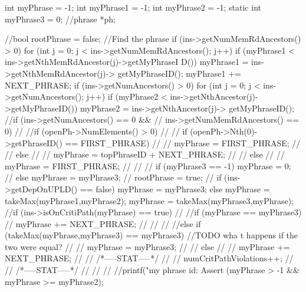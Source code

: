 \begin{DoxyCode}
                                            {
        int myPhrase  = -1;
        int myPhrase1 = -1;
        int myPhrase2 = -1;
        static int myPhrase3 = 0;
        //phrase *ph;

        //bool rootPhrase = false;
        //Find the phrase
        if (ins->getNumMemRdAncestors() > 0) {
                for (int j = 0; j < ins->getNumMemRdAncestors(); j++) {
                        if (myPhrase1 < ins->getNthMemRdAncestor(j)->getMyPhraseI
      D()) {
                                myPhrase1 = ins->getNthMemRdAncestor(j)->
      getMyPhraseID();
                        }
                }
                myPhrase1 += NEXT_PHRASE;
        } 
        if (ins->getNumAncestors() > 0) {
                for (int j = 0; j < ins->getNumAncestors(); j++) {
                        if (myPhrase2 < ins->getNthAncestor(j)->getMyPhraseID()) 
      {
                                myPhrase2 = ins->getNthAncestor(j)->
      getMyPhraseID();
                        }
                }
        }
        //if (ins->getNumAncestors() == 0 &&
        //    ins->getNumMemRdAncestors() == 0) {
        //      //if (openPh->NumElements() > 0) {
        //      //      if (openPh->Nth(0)->getPhraseID() == FIRST_PHRASE)
        //      //              myPhrase = FIRST_PHRASE;
        //      //      else
        //      //              myPhrase = topPhraseID + NEXT_PHRASE;
        //      //} else {
        //      //      myPhrase = FIRST_PHRASE;
        //      //}
        //      if (myPhrase3 == -1) myPhrase = 0;
        //      else myPhrase = myPhrase3;
        //      rootPhrase = true;
        //}
        if (ins->getDepOnUPLD() == false) {
                myPhrase = myPhrase3;
        } else {
                myPhrase = takeMax(myPhrase1,myPhrase2);
                myPhrase = takeMax(myPhrase3,myPhrase);
        }
        //if (ins->isOnCritiPath(myPhrase) == true) {
        //      //if (myPhrase == myPhrase3) {
        //              myPhrase += NEXT_PHRASE;
        //      //}
        //      //else if (takeMax(myPhrase,myPhrase3) == myPhrase3) { //TODO wha
      t happens if the two were equal?
        //      //      myPhrase = myPhrase3;
        //      //} else {
        //      //      myPhrase += NEXT_PHRASE;
        //      //      /*-----STAT-----*/
        //      //      numCritPathViolations++;
        //      //      /*-----STAT-----*/
        //      //}
        //}
        //printf("my phrase id: %
        Assert (myPhrase > -1 && myPhrase >= myPhrase2);

}
\end{DoxyCode}
